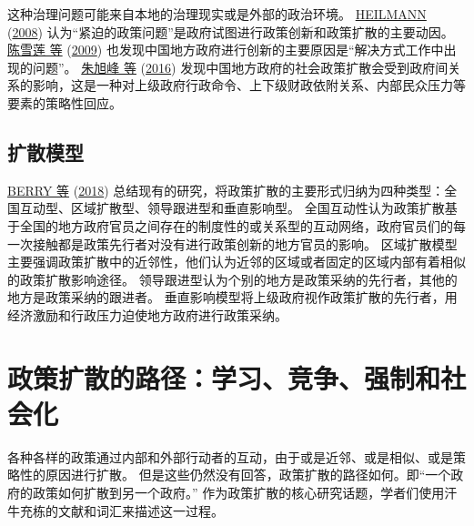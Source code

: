 \documentclass[
  12pt,
]{ctexart}
\begin{document}
这种治理问题可能来自本地的治理现实或是外部的政治环境。
\protect\hyperlink{ref-Heilmann2008}{HEILMANN} (\protect\hyperlink{ref-Heilmann2008}{2008}) 认为``紧迫的政策问题''是政府试图进行政策创新和政策扩散的主要动因。
\protect\hyperlink{ref-ChenXueLianYangXueDong2009}{陈雪莲 等} (\protect\hyperlink{ref-ChenXueLianYangXueDong2009}{2009}) 也发现中国地方政府进行创新的主要原因是``解决方式工作中出现的问题''。
\protect\hyperlink{ref-ZhuXuFengZhaoHui2016}{朱旭峰 等} (\protect\hyperlink{ref-ZhuXuFengZhaoHui2016}{2016}) 发现中国地方政府的社会政策扩散会受到政府间关系的影响，这是一种对上级政府行政命令、上下级财政依附关系、内部民众压力等要素的策略性回应。

\hypertarget{ux6269ux6563ux6a21ux578b}{%
\subsection{扩散模型}\label{ux6269ux6563ux6a21ux578b}}

\protect\hyperlink{ref-BerryBerry2018}{BERRY 等} (\protect\hyperlink{ref-BerryBerry2018}{2018}) 总结现有的研究，将政策扩散的主要形式归纳为四种类型：全国互动型、区域扩散型、领导跟进型和垂直影响型。
全国互动性认为政策扩散基于全国的地方政府官员之间存在的制度性的或关系型的互动网络，政府官员们的每一次接触都是政策先行者对没有进行政策创新的地方官员的影响。
区域扩散模型主要强调政策扩散中的近邻性，他们认为近邻的区域或者固定的区域内部有着相似的政策扩散影响途径。
领导跟进型认为个别的地方是政策采纳的先行者，其他的地方是政策采纳的跟进者。
垂直影响模型将上级政府视作政策扩散的先行者，用经济激励和行政压力迫使地方政府进行政策采纳。

\newpage

\hypertarget{ux653fux7b56ux6269ux6563ux7684ux8defux5f84ux5b66ux4e60ux7adeux4e89ux5f3aux5236ux548cux793eux4f1aux5316}{%
\section{政策扩散的路径：学习、竞争、强制和社会化}\label{ux653fux7b56ux6269ux6563ux7684ux8defux5f84ux5b66ux4e60ux7adeux4e89ux5f3aux5236ux548cux793eux4f1aux5316}}

各种各样的政策通过内部和外部行动者的互动，由于或是近邻、或是相似、或是策略性的原因进行扩散。
但是这些仍然没有回答，政策扩散的路径如何。即``一个政府的政策如何扩散到另一个政府。''
作为政策扩散的核心研究话题，学者们使用汗牛充栋的文献和词汇来描述这一过程。
\end{document}
